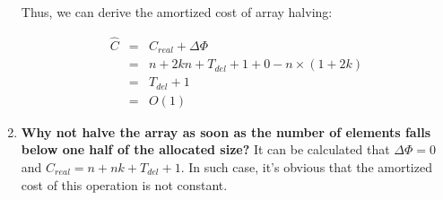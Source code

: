 \begin{enumerate}
Thus, we can derive the amortized cost of array halving:

\[
\begin{array}{lcl}
\hat C & = & C_{real} + \Delta \Phi \\
       & = & n + 2kn + T_{del} + 1 + 0 - n \times (1 + 2k) \\
       & = & T_{del} + 1 \\
       & = & O(1)
\end{array}
\]

\item \textbf{Why not halve the array as soon as the number of elements falls below one half of the allocated size?} It can be calculated that $\Delta \Phi = 0$ and $C_{real} = n + nk + T_{del} + 1$. In such case, it's obvious that the amortized cost of this operation is not constant.

\end{enumerate}